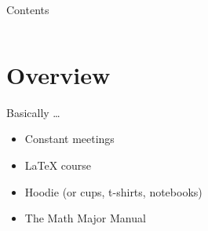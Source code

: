 \begin{frame}
    \maketitle
\end{frame}

\begin{frame}{Contents}
    \begin{columns}
        \linespread{1.75}\selectfont
         \tableofcontents
    \end{columns}
   
\end{frame}

\section{Overview}

\begin{frame}{Basically \ldots}
    \begin{itemize}
        \item Constant meetings
        \item LaTeX course
        \item Hoodie (or cups, t-shirts, notebooks)
        \item The Math Major Manual
    \end{itemize}
\end{frame}